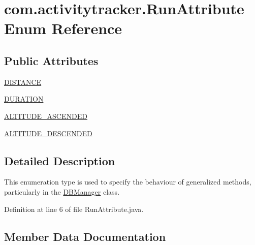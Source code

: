 \hypertarget{enumcom_1_1activitytracker_1_1_run_attribute}{}\section{com.\+activitytracker.\+Run\+Attribute Enum Reference}
\label{enumcom_1_1activitytracker_1_1_run_attribute}
\subsection*{Public Attributes}
\begin{DoxyCompactItemize}
\item 
\mbox{\hyperlink{enumcom_1_1activitytracker_1_1_run_attribute_a90ee541e68e458a0bb3f5ea45fd46ec0}{D\+I\+S\+T\+A\+N\+CE}}
\item 
\mbox{\hyperlink{enumcom_1_1activitytracker_1_1_run_attribute_a7adf133b2a62f1f99ffc2adfb7097ec9}{D\+U\+R\+A\+T\+I\+ON}}
\item 
\mbox{\hyperlink{enumcom_1_1activitytracker_1_1_run_attribute_abcfe85bf48187d67842a0525c1bcc0af}{A\+L\+T\+I\+T\+U\+D\+E\+\_\+\+A\+S\+C\+E\+N\+D\+ED}}
\item 
\mbox{\hyperlink{enumcom_1_1activitytracker_1_1_run_attribute_a337a68867cfdb8ec7a17c318ad8b216b}{A\+L\+T\+I\+T\+U\+D\+E\+\_\+\+D\+E\+S\+C\+E\+N\+D\+ED}}
\end{DoxyCompactItemize}


\subsection{Detailed Description}
This enumeration type is used to specify the behaviour of generalized methods, particularly in the \mbox{\hyperlink{classcom_1_1activitytracker_1_1_d_b_manager}{D\+B\+Manager}} class. 

Definition at line 6 of file Run\+Attribute.\+java.



\subsection{Member Data Documentation}
\mbox{\label{enumcom_1_1activitytracker_1_1_run_attribute_abcfe85bf48187d67842a0525c1bcc0af}} 
